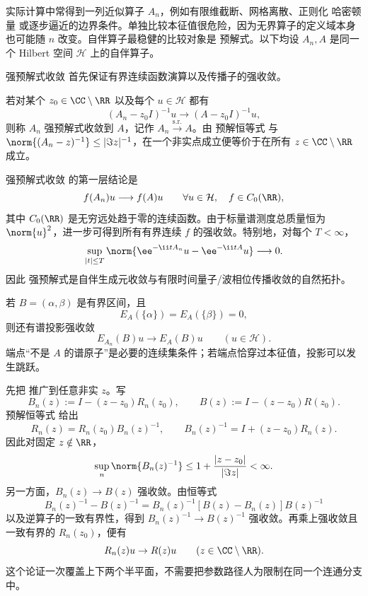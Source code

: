 实际计算中常得到一列近似算子 $A_n$，例如有限维截断、网格离散、正则化 哈密顿量 或逐步逼近的边界条件。单独比较本征值很危险，因为无界算子的定义域本身也可能随 $n$ 改变。自伴算子最稳健的比较对象是 预解式。以下均设 $A_n,A$ 是同一个 Hilbert 空间 $\mathcal H$ 上的自伴算子。

强预解式收敛 首先保证有界连续函数演算以及传播子的强收敛。

若对某个 $z_0\in\CC\setminus\RR$ 以及每个 $u\in\mathcal H$ 都有
\begin{equation}\label{eq:math-sl-strong-resolvent-def}
 (A_n-z_0I)^{-1}u\longrightarrow(A-z_0I)^{-1}u,
\end{equation}
则称 $A_n$ 强预解式收敛到 $A$，记作 $A_n\xrightarrow{\mathrm{s.r.}}A$。由 预解恒等式 与
$\norm{(A_n-z)^{-1}}\le|\Im z|^{-1}$，在一个非实点成立便等价于在所有 $z\in\CC\setminus\RR$ 成立。

强预解式收敛 的第一层结论是
\begin{equation}\label{eq:math-sl-strong-resolvent-c0}
 f(A_n)u\longrightarrow f(A)u
 \qquad
 \forall u\in\mathcal H,
 \quad f\in C_0(\RR),
\end{equation}
其中 $C_0(\RR)$ 是无穷远处趋于零的连续函数。由于标量谱测度总质量恒为 $\norm{u}^2$，进一步可得到所有有界连续 $f$ 的强收敛。特别地，对每个 $T<\infty$，
\begin{equation}\label{eq:math-sl-strong-resolvent-unitary}
 \sup_{|t|\le T}
 \norm{\ee^{-\ii tA_n}u-\ee^{-\ii tA}u}
 \longrightarrow0.
\end{equation}
因此 强预解式是自伴生成元收敛与有限时间量子/波相位传播收敛的自然拓扑。

若 $B=(\alpha,\beta)$ 是有界区间，且
\[
 E_A(\{\alpha\})=E_A(\{\beta\})=0,
\]
则还有谱投影强收敛
\begin{equation}\label{eq:math-sl-strong-spectral-projection}
 E_{A_n}(B)u\longrightarrow E_A(B)u
 \qquad(u\in\mathcal H).
\end{equation}
端点“不是 $A$ 的谱原子”是必要的连续集条件；若端点恰穿过本征值，投影可以发生跳跃。

先把 推广到任意非实 $z$。写
\[
 B_n(z):=I-(z-z_0)R_n(z_0),
 \qquad
 B(z):=I-(z-z_0)R(z_0).
\]
预解恒等式 给出
\[
 R_n(z)=R_n(z_0)B_n(z)^{-1},
 \qquad
 B_n(z)^{-1}=I+(z-z_0)R_n(z).
\]
因此对固定 $z\notin\RR$，
\[
 \sup_n\norm{B_n(z)^{-1}}
 \le1+\frac{|z-z_0|}{|\Im z|}<\infty.
\]
另一方面，$B_n(z)\to B(z)$ 强收敛。由恒等式
\[
 B_n(z)^{-1}-B(z)^{-1}
 =B_n(z)^{-1}[B(z)-B_n(z)]B(z)^{-1}
\]
以及逆算子的一致有界性，得到 $B_n(z)^{-1}\to B(z)^{-1}$ 强收敛。再乘上强收敛且一致有界的 $R_n(z_0)$，便有
\[
 R_n(z)u\to R(z)u
 \qquad(z\in\CC\setminus\RR).
\]
这个论证一次覆盖上下两个半平面，不需要把参数路径人为限制在同一个连通分支中。

